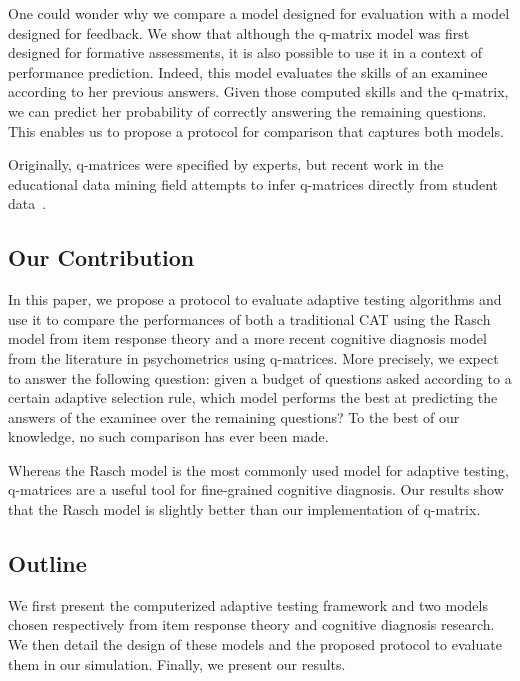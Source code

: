 \documentclass{sig-alternate}
\begin{document}
One could wonder why we compare a model designed for evaluation with a model designed for feedback. We show that although the q-matrix model was first designed for formative assessments, it is also possible to use it in a context of performance prediction. Indeed, this model evaluates the skills of an examinee according to her previous answers. Given those computed skills and the q-matrix, we can predict her probability of correctly answering the remaining questions. This enables us to propose a protocol for comparison that captures both models.

Originally, q-matrices were specified by experts, but recent work in the educational data mining field attempts to infer q-matrices directly from student data~\cite{Huebner2010}. %

\subsection{Our Contribution}

In this paper, we propose a protocol to evaluate adaptive testing algorithms and use it to compare the performances of both a traditional CAT using the Rasch model from item response theory and a more recent cognitive diagnosis model from the literature in psychometrics using q-matrices. More precisely, we expect to answer the following question: given a budget of questions asked according to a certain adaptive selection rule, which model performs the best at predicting the answers of the examinee over the remaining questions? To the best of our knowledge, no such comparison has ever been made.

Whereas the Rasch model is the most commonly used model for adaptive testing, q-matrices are a useful tool for fine-grained cognitive diagnosis. Our results show that the Rasch model is slightly better than our implementation of q-matrix.

\subsection{Outline}

We first present the computerized adaptive testing framework and two models chosen respectively from item response theory and cognitive diagnosis research. We then detail the design of these models and the proposed protocol to evaluate them in our simulation. Finally, we present our results.
\end{document}
